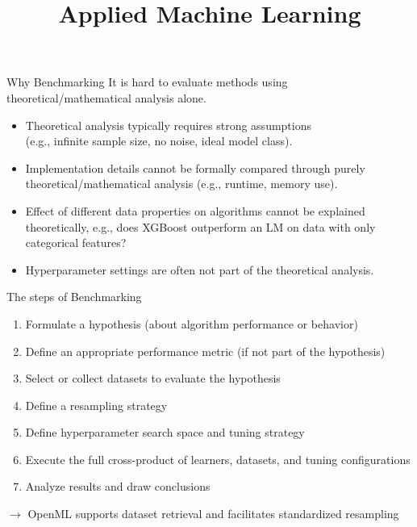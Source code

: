 \documentclass[11pt,compress,t,notes=noshow, xcolor=table]{beamer}
\title{Applied Machine Learning}
\date{}
\begin{document}


\begin{vbframe}{Why Benchmarking}
\vfill
It is hard to evaluate methods using theoretical/mathematical analysis alone.
\vfill
\begin{itemize}
    \item Theoretical analysis typically requires strong assumptions \\
    (e.g., infinite sample size, no noise, ideal model class).
    \item Implementation details cannot be formally compared through purely theoretical/mathematical analysis (e.g., runtime, memory use).
    \item Effect of different data properties on algorithms cannot be explained theoretically, e.g., does XGBoost outperform an LM on data with only categorical features?
    \item Hyperparameter settings are often not part of the theoretical analysis.
\end{itemize}
\vfill
\end{vbframe}

\begin{vbframe}{The steps of Benchmarking}
\vfill
\begin{enumerate}
    \item Formulate a hypothesis (about algorithm performance or behavior)
    \item Define an appropriate performance metric (if not part of the hypothesis)
    \item Select or collect datasets to evaluate the hypothesis
    \item Define a resampling strategy
    \item Define hyperparameter search space and tuning strategy
    \item Execute the full cross-product of learners, datasets, and tuning configurations
    \item Analyze results and draw conclusions
\end{enumerate}
\vfill
\pause
$\rightarrow$ OpenML supports dataset retrieval and facilitates standardized resampling
\end{vbframe}
\end{document}
